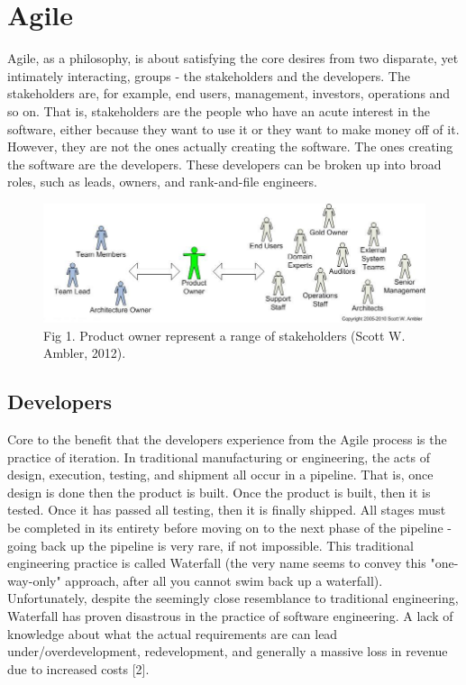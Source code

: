 \documentclass[format=acmsmall, review=false, screen=true, anonymous=True]{acmart}
\begin{document}
\section{Agile}
Agile, as a philosophy, is about satisfying the core desires from two disparate, yet intimately interacting, groups - the stakeholders and the developers. The stakeholders are, for example, end users, management, investors, operations and so on. That is, stakeholders are the people who have an acute interest in the software, either because they want to use it or they want to make money off of it. However, they are not the ones actually creating the software. The ones creating the software are the developers. These developers can be broken up into broad roles, such as leads, owners, and rank-and-file engineers.

\begin{figure}
  \includegraphics[width=\linewidth]{productOwner.jpg}
  \caption{Fig 1. Product owner represent a range of stakeholders (Scott W. Ambler, 2012).}
\end{figure}

\subsection{Developers}
Core to the benefit that the developers experience from the Agile process is the practice of iteration. In traditional manufacturing or engineering, the acts of design, execution, testing, and shipment all occur in a pipeline. That is, once design is done then the product is built. Once the product is built, then it is tested. Once it has passed all testing, then it is finally shipped. All stages must be completed in its entirety before moving on to the next phase of the pipeline - going back up the pipeline is very rare, if not impossible. This traditional engineering practice is called Waterfall (the very name seems to convey this "one-way-only" approach, after all you cannot swim back up a waterfall). Unfortunately, despite the seemingly close resemblance to traditional engineering, Waterfall has proven disastrous in the practice of software engineering. A lack of knowledge about what the actual requirements are can lead under/overdevelopment, redevelopment, and generally a massive loss in revenue due to increased costs [2].
\end{document}
